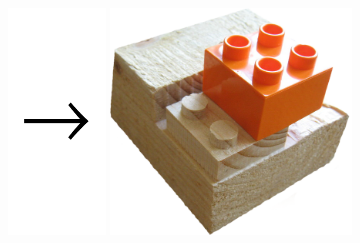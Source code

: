 \documentclass[t]{beamer}
\begin{document}
\begin{frame}
\begin{center}
    \includegraphics[height=6cm]{../img/pfeil.pdf}
    \includegraphics[height=6cm]{../img/fraese-lego.png}

    \end{center}
\end{frame}
\end{document}
